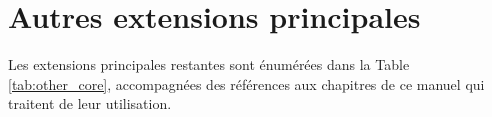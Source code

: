 \section{Autres extensions principales}


Les extensions principales restantes sont énumérées dans la Table \ref{tab:other_core},
accompagnées des références aux chapitres de ce manuel qui traitent de leur
utilisation.


